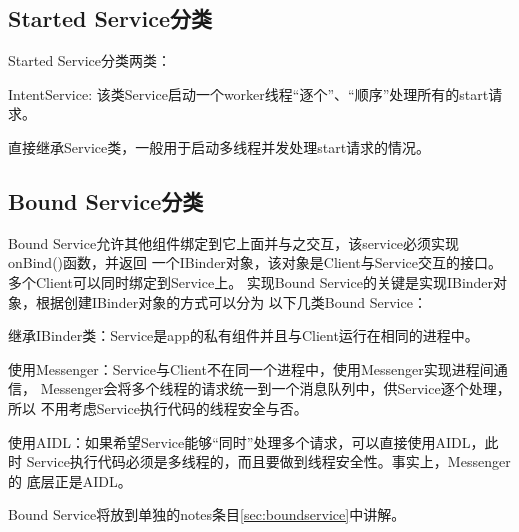 \subsection[Started Service分类]{Started Service分类}
Started Service分类两类：\par
\begin{coloredenumerate}
  \item IntentService: 该类Service启动一个worker线程“逐个”、“顺序”处理所有的start请求。
  \item 直接继承Service类，一般用于启动多线程并发处理start请求的情况。
\end{coloredenumerate}

\subsection[Bound Service分类]{Bound Service分类}
Bound Service允许其他组件绑定到它上面并与之交互，该service必须实现onBind()函数，并返回
一个IBinder对象，该对象是Client与Service交互的接口。多个Client可以同时绑定到Service上。
实现Bound Service的关键是实现IBinder对象，根据创建IBinder对象的方式可以分为
以下几类Bound Service：\par
\begin{coloredenumerate}
  \item 继承IBinder类：Service是app的私有组件并且与Client运行在相同的进程中。
  \item 使用Messenger：Service与Client不在同一个进程中，使用Messenger实现进程间通信，
        Messenger会将多个线程的请求统一到一个消息队列中，供Service逐个处理，所以
        不用考虑Service执行代码的线程安全与否。
  \item 使用AIDL：如果希望Service能够“同时”处理多个请求，可以直接使用AIDL，此时
        Service执行代码必须是多线程的，而且要做到线程安全性。事实上，Messenger的
        底层正是AIDL。
\end{coloredenumerate}
Bound Service将放到单独的notes条目\ref{sec:boundservice}中讲解。

